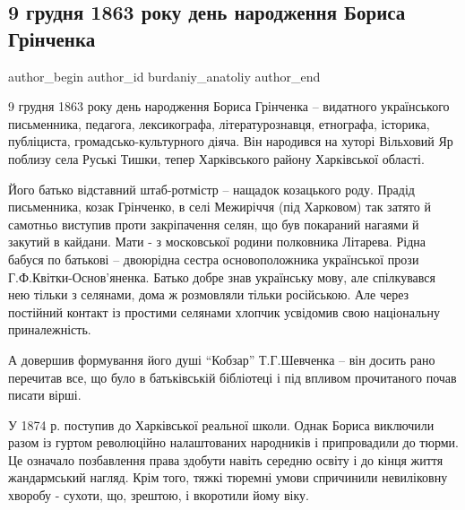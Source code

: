  
 
 
 
 
 
\subsection{9 грудня 1863 року день народження Бориса Грінченка}
\label{sec:09_12_2020.fb.burdaniy_anatoliy.1.boris_grinchenko}
\ifcmt
	author_begin
   author_id burdaniy_anatoliy
	author_end
\fi


9 грудня 1863 року день народження Бориса Грінченка – видатного українського
письменника, педагога, лексикографа, літературознавця, етнографа, історика,
публіциста, громадсько-культурного діяча. Він народився  на хуторі Вільховий Яр
поблизу села Руські Тишки, тепер Харківського району Харківської області.

Його батько відставний штаб-ротмістр – нащадок козацького роду. Прадід
письменника, козак Грінченко, в селі Межиріччя (під Харковом) так затято й
самотньо виступив проти закріпачення селян, що був покараний нагаями й закутий
в кайдани. Мати - з московської родини полковника Літарева. Рідна бабуся по
батькові – двоюрідна сестра основоположника української прози
Г.Ф.Квітки-Основ’яненка. Батько добре знав українську мову, але спілкувався нею
тільки з селянами, дома ж розмовляли тільки російською. Але через постійний
контакт із простими селянами хлопчик усвідомив  свою національну приналежність.

А довершив формування його душі \enquote{Кобзар} Т.Г.Шевченка – він досить рано
перечитав все, що було в батьківській бібліотеці і під впливом прочитаного
почав писати вірші.

У 1874 р. поступив до Харківської реальної школи. Однак Бориса виключили разом
із гуртом революційно налаштованих народників і припровадили до тюрми. Це
означало позбавлення права здобути навіть середню освіту і  до кінця життя
жандармський нагляд. Крім того, тяжкі тюремні умови спричинили невиліковну
хворобу - сухоти, що, зрештою, і вкоротили йому віку.

